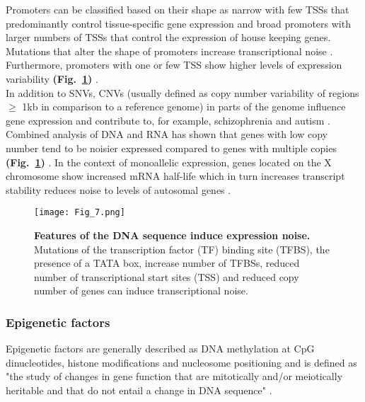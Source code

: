 Promoters can be classified based on their shape as narrow with few \glspl{TSS} that predominantly control tissue-specific gene expression and broad promoters with larger numbers of TSSs that control the expression of house keeping genes. Mutations that alter the shape of promoters increase transcriptional noise \citep{Schor2017a}. Furthermore, promoters with one or few TSS show higher levels of expression variability \textbf{(Fig.~\ref{fig0:DNA_features})} \citep{Faure2017}.\\

In addition to SNVs, \glspl{CNV} (usually defined as copy number variability of regions $\geq$ 1kb in comparison to a reference genome) in parts of the genome influence gene expression and contribute to, for example, schizophrenia and autism \citep{Gamazon2015}. Combined analysis of DNA and RNA has shown that genes with low copy number tend to be noisier expressed compared to genes with multiple copies \textbf{(Fig.~\ref{fig0:DNA_features})} \citep{Dey2015}. In the context of monoallelic expression, genes located on the X chromosome show increased mRNA half-life which in turn increases transcript stability reduces noise  to levels of autosomal genes \citep{Faure2017}.

\begin{figure}[!h]
\centering
\texttt{[image: Fig\_7.png]}
\caption[Features of the DNA sequence induce expression noise]{\textbf{Features of the DNA sequence induce expression noise.}\\
Mutations of the transcription factor (TF) binding site (TFBS), the presence of a TATA box, increase number of TFBSs, reduced number of transcriptional start sites (TSS) and reduced copy number of genes can induce transcriptional noise.}
\label{fig0:DNA_features}
\end{figure}

\subsubsection{Epigenetic factors}
\label{sec0:epigenetic}

Epigenetic factors are generally described as DNA methylation at \gls{CpG} dinucleotides, histone modifications and nucleosome positioning  \citep{Portela2010} and is defined as "the study of changes in gene function that are mitotically and/or meiotically heritable and that do not entail a change in DNA sequence" \citep{Wu2001}. \\

